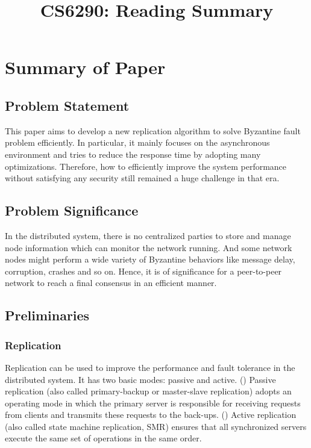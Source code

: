 \documentclass[conference]{IEEEtran}
\begin{document}
\title{CS6290: Reading Summary }

\author{
}

\maketitle

\section{Summary of Paper \cite{castro1999practical}}


\subsection{Problem Statement}
This paper aims to develop a new replication algorithm to solve Byzantine fault problem efficiently.
%
In particular, it mainly focuses on the asynchronous environment and tries to reduce the response time by adopting many optimizations. 
%
Therefore, how to efficiently improve the system performance without satisfying any security still remained a huge challenge in that era.

\subsection{Problem Significance}
In the distributed system, there is no centralized parties to store and manage node information which can monitor the network running.
%
And some network nodes might perform a wide variety of Byzantine behaviors like message delay, corruption, crashes and so on.
%
Hence, it is of significance for a peer-to-peer network to reach a final consensus in an efficient manner.
 
\subsection{Preliminaries}
\subsubsection{Replication} 
Replication can be used to improve the performance and fault tolerance in the distributed system.
%
It has two basic modes: passive and active.
%
() Passive replication (also called primary-backup or master-slave replication) adopts an operating mode in which the primary server is responsible for receiving requests from clients and transmits these requests to the back-ups. 
%
() Active replication (also called state machine replication, SMR) ensures that all synchronized servers execute the same set of operations in the same order.
\end{document}
